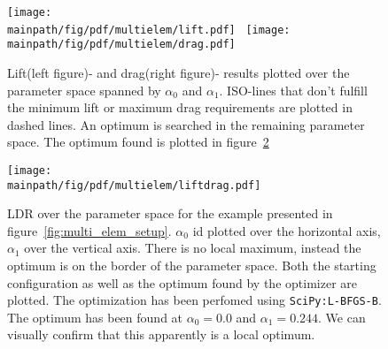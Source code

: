 \documentclass[../main.tex]{subfiles}
\begin{document}
\begin{figure}[t!]
    \centering
    	\texttt{[image: \\mainpath/fig/pdf/multielem/lift.pdf]}~
    	\texttt{[image: \\mainpath/fig/pdf/multielem/drag.pdf]}
    	\caption[Multi-element example: lift and drag]{Lift(left figure)- and drag(right figure)- results plotted over the parameter space spanned by $\alpha_0$ and $\alpha_1$. ISO-lines that don't fulfill the minimum lift or maximum drag requirements are plotted in dashed lines. An optimum is searched in the remaining parameter space. The optimum found is plotted in figure~\ref{fig:multi_elem_ldr}}
    	\label{fig:multi_elem_liftanddrag}
\end{figure}

\begin{figure}[t!]
    \centering
    	\texttt{[image: \\mainpath/fig/pdf/multielem/liftdrag.pdf]}
    	\caption[Multi-element example: LDR-ratio]{\acf{LDR} over the parameter space for the example presented in figure~\ref{fig:multi_elem_setup}. $\alpha_0$ id plotted over the horizontal axis, $\alpha_1$ over the vertical axis. There is no local maximum, instead the optimum is on the border of the parameter space. Both the starting configuration as well as the optimum found by the optimizer are plotted. The optimization has been perfomed using \texttt{SciPy:L-BFGS-B}. The optimum has been found at $\alpha_0=0.0$ and $\alpha_1=0.244$. We can visually confirm that this apparently is a local optimum.}
    	\label{fig:multi_elem_ldr}
\end{figure}
\end{document}
